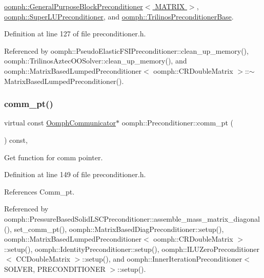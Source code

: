 \hyperlink{classoomph_1_1GeneralPurposeBlockPreconditioner_a3272742d3c7f86327d33c5647af874e6}{oomph\+::\+General\+Purpose\+Block\+Preconditioner$<$ M\+A\+T\+R\+I\+X $>$}, \hyperlink{classoomph_1_1SuperLUPreconditioner_aa0a50217f8416c55af700cbedd750900}{oomph\+::\+Super\+L\+U\+Preconditioner}, and \hyperlink{classoomph_1_1TrilinosPreconditionerBase_a6cc1da6ffb61bec844ccd33f6e5e8807}{oomph\+::\+Trilinos\+Preconditioner\+Base}.



Definition at line 127 of file preconditioner.\+h.



Referenced by oomph\+::\+Pseudo\+Elastic\+F\+S\+I\+Preconditioner\+::clean\+\_\+up\+\_\+memory(), oomph\+::\+Trilinos\+Aztec\+O\+O\+Solver\+::clean\+\_\+up\+\_\+memory(), and oomph\+::\+Matrix\+Based\+Lumped\+Preconditioner$<$ oomph\+::\+C\+R\+Double\+Matrix $>$\+::$\sim$\+Matrix\+Based\+Lumped\+Preconditioner().

\mbox{\label{classoomph_1_1Preconditioner_ada7219933e05d94f39a46a8ddb4c749a}} 
\subsubsection{\texorpdfstring{comm\+\_\+pt()}{comm\_pt()}}
{\footnotesize\ttfamily virtual const \hyperlink{classoomph_1_1OomphCommunicator}{Oomph\+Communicator}$\ast$ oomph\+::\+Preconditioner\+::comm\+\_\+pt (\begin{DoxyParamCaption}{ }\end{DoxyParamCaption}) const\hspace{0.3cm}{\ttfamily [inline]}, {\ttfamily [virtual]}}



Get function for comm pointer. 



Definition at line 149 of file preconditioner.\+h.



References Comm\+\_\+pt.



Referenced by oomph\+::\+Pressure\+Based\+Solid\+L\+S\+C\+Preconditioner\+::assemble\+\_\+mass\+\_\+matrix\+\_\+diagonal(), set\+\_\+comm\+\_\+pt(), oomph\+::\+Matrix\+Based\+Diag\+Preconditioner\+::setup(), oomph\+::\+Matrix\+Based\+Lumped\+Preconditioner$<$ oomph\+::\+C\+R\+Double\+Matrix $>$\+::setup(), oomph\+::\+Identity\+Preconditioner\+::setup(), oomph\+::\+I\+L\+U\+Zero\+Preconditioner$<$ C\+C\+Double\+Matrix $>$\+::setup(), and oomph\+::\+Inner\+Iteration\+Preconditioner$<$ S\+O\+L\+V\+E\+R, P\+R\+E\+C\+O\+N\+D\+I\+T\+I\+O\+N\+E\+R $>$\+::setup().

